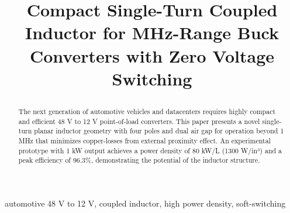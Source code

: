 \documentclass{IPEC2026}
\begin{document}
\title{Compact Single-Turn Coupled Inductor for MHz-Range Buck Converters with Zero Voltage Switching

}




\maketitle

\begin{abstract}
The next generation of automotive vehicles and datacenters requires highly compact and efficient 48 V to 12 V point-of-load converters. This paper presents a novel single-turn planar inductor geometry with four poles and dual air gap for operation beyond 1 MHz that minimizes copper-losses from external proximity effect. An experimental prototype with 1 kW output achieves a power density of 80 kW/L (1300 W/in³) and a peak efficiency of 96.3\%, demonstrating the potential of the inductor structure.
\end{abstract}

\begin{IEEEkeywords}
automotive 48 V to 12 V, coupled inductor, high power density, soft-switching
\end{IEEEkeywords}
\end{document}
